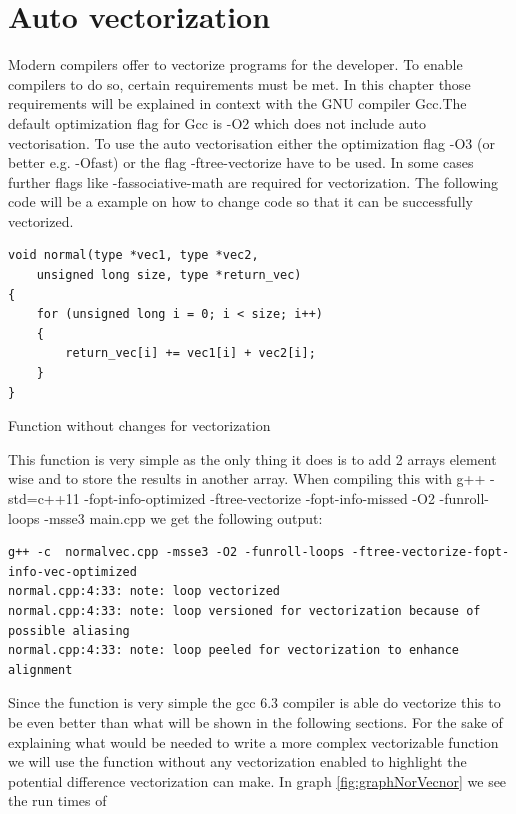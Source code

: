 \documentclass[
	12pt,
	a4paper,
	BCOR10mm,
	DIV14,
	headsepline,
	usegeometry,
]{scrreprt}
\begin{document}
\chapter{Auto vectorization}
Modern compilers offer to vectorize programs for the developer. To enable compilers to do so,
certain requirements must be met. In this chapter those requirements will be explained in context
with the GNU compiler Gcc.The default optimization flag for Gcc is -O2 which does not include 
auto vectorisation. To use the auto vectorisation either the optimization flag -O3 (or better e.g. -Ofast)
or the flag -ftree-vectorize have to be used. In some cases further flags like -fassociative-math
are required for vectorization. The following code will be a example on how to change code so that
it can be successfully vectorized.
\begin{listing}[ht]
\begin{verbatim}
void normal(type *vec1, type *vec2,
    unsigned long size, type *return_vec)
{
    for (unsigned long i = 0; i < size; i++)
    {
        return_vec[i] += vec1[i] + vec2[i];
    }
}
\end{verbatim}
\caption{Function without changes for vectorization}
\label{lst:code1}
\end{listing}
This function is very simple as the only thing it does is to add 2 arrays element wise and to store
the results in another array.
When compiling this with \newline
g++ -std=c++11 -fopt-info-optimized -ftree-vectorize -fopt-info-missed -O2 -funroll-loops -msse3
main.cpp we get the following output:
\begin{verbatim}
g++ -c  normalvec.cpp -msse3 -O2 -funroll-loops -ftree-vectorize-fopt-info-vec-optimized
normal.cpp:4:33: note: loop vectorized
normal.cpp:4:33: note: loop versioned for vectorization because of possible aliasing
normal.cpp:4:33: note: loop peeled for vectorization to enhance alignment
\end{verbatim}
Since the function is very simple the gcc 6.3 compiler is able do vectorize this to be even better
than what will be shown in the following sections. For the sake of explaining what would be needed
to write a more complex vectorizable function we will use the function without any vectorization enabled to
highlight the potential difference vectorization can make. In graph \ref{fig:graphNorVecnor} we see the run times of
\end{document}
